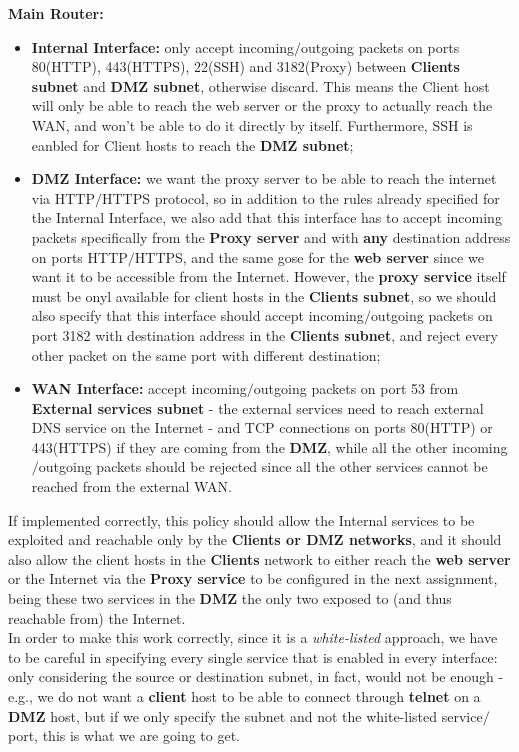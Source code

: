 \textbf{Main Router:}
\begin{itemize}
\item \textbf{Internal Interface:} only accept incoming$/$outgoing packets on ports 80(HTTP), 443(HTTPS), 22(SSH) and 3182(Proxy) between \textbf{Clients subnet} and \textbf{DMZ subnet}, otherwise discard. This means the Client host will only be able to reach the web server or the proxy to actually reach the WAN, and won't be able to do it directly by itself. Furthermore, SSH is eanbled for Client hosts to reach the \textbf{DMZ subnet};
\item \textbf{DMZ Interface:} we want the proxy server to be able to reach the internet via HTTP$/$HTTPS protocol, so in addition to the rules already specified for the Internal Interface, we also add that this interface has to accept incoming packets specifically from the \textbf{Proxy server} and with \textbf{any} destination address on ports HTTP$/$HTTPS, and the same gose for the \textbf{web server} since we want it to be accessible from the Internet. However, the \textbf{proxy service} itself must be onyl available for client hosts in the \textbf{Clients subnet}, so we should also specify that this interface should accept incoming$/$outgoing packets on port 3182 with destination address in the \textbf{Clients subnet}, and reject every other packet on the same port with different destination;
\item \textbf{WAN Interface:} accept incoming$/$outgoing packets on port 53 from \textbf{External services subnet} - the external services need to reach external DNS service on the Internet - and TCP connections on ports 80(HTTP) or 443(HTTPS) if they are coming from the \textbf{DMZ}, while all the other incoming$/$outgoing packets should be rejected since all the other services cannot be reached from the external WAN.
\end{itemize}

If implemented correctly, this policy should allow the Internal services to be exploited and reachable only by the \textbf{Clients or DMZ networks}, and it should also allow the client hosts in the \textbf{Clients} network to either reach the \textbf{web server} or the Internet via the \textbf{Proxy service} to be configured in the next assignment, being these two services in the \textbf{DMZ} the only two exposed to (and thus reachable from) the Internet.\\
In order to make this work correctly, since it is a \textit{white-listed} approach, we have to be careful in specifying every single service that is enabled in every interface: only considering the source or destination subnet, in fact, would not be enough - e.g., we do not want a \textbf{client} host to be able to connect through \textbf{telnet} on a \textbf{DMZ} host, but if we only specify the subnet and not the white-listed service$/$port, this is what we are going to get.
